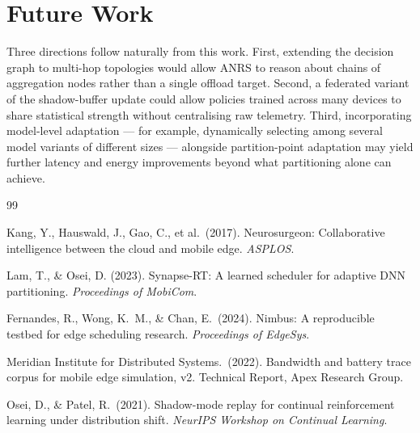 \section{Future Work}

Three directions follow naturally from this work. First, extending the decision graph to multi-hop topologies would allow ANRS to reason about chains of aggregation nodes rather than a single offload target. Second, a federated variant of the shadow-buffer update could allow policies trained across many devices to share statistical strength without centralising raw telemetry. Third, incorporating model-level adaptation --- for example, dynamically selecting among several model variants of different sizes --- alongside partition-point adaptation may yield further latency and energy improvements beyond what partitioning alone can achieve.

\begin{thebibliography}{99}

Kang, Y., Hauswald, J., Gao, C., et al.\ (2017). Neurosurgeon: Collaborative intelligence between the cloud and mobile edge. \emph{ASPLOS}.

Lam, T., \& Osei, D. (2023). Synapse-RT: A learned scheduler for adaptive DNN partitioning. \emph{Proceedings of MobiCom}.

Fernandes, R., Wong, K.\ M., \& Chan, E.\ (2024). Nimbus: A reproducible testbed for edge scheduling research. \emph{Proceedings of EdgeSys}.

Meridian Institute for Distributed Systems.\ (2022). Bandwidth and battery trace corpus for mobile edge simulation, v2. Technical Report, Apex Research Group.

Osei, D., \& Patel, R.\ (2021). Shadow-mode replay for continual reinforcement learning under distribution shift. \emph{NeurIPS Workshop on Continual Learning}.

\end{thebibliography}
